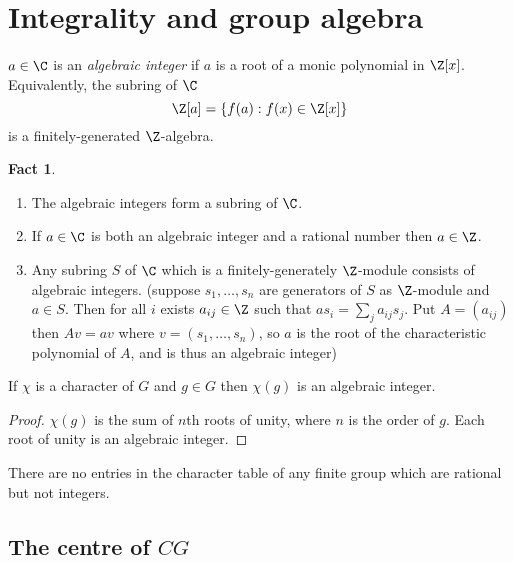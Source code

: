 \documentclass[a4paper]{article}
\theoremstyle{definition}
\newtheorem*{fact}{Fact}
\begin{document}
\section{Integrality and group algebra}

\begin{definition}
  \(a \in \C\) is an \emph{algebraic integer} if \(a\) is a root of a monic polynomial in \(\Z[x]\). Equivalently, the subring of \(\C\)
  \[
    \Z[a] = \{f(a): f(x) \in \Z[x]\}
  \]
  is a finitely-generated \(\Z\)-algebra.
\end{definition}

\begin{fact}\leavevmode
  \begin{enumerate}
  \item The algebraic integers form a subring of \(\C\).
  \item If \(a \in \C\) is both an algebraic integer and a rational number then \(a \in \Z\).
  \item Any subring \(S\) of \(\C\) which is a finitely-generately \(\Z\)-module consists of algebraic integers. (suppose \(s_1, \dots, s_n\) are generators of \(S\) as \(\Z\)-module and \(a \in S\). Then for all \(i\) exists \(a_{ij} \in \Z\) such that \(as_i = \sum_j a_{ij} s_j\). Put \(A = (a_{ij})\) then \(Av = av\) where \(v = (s_1, \dots, s_n)\), so \(a\) is the root of the characteristic polynomial of \(A\), and is thus an algebraic integer)
  \end{enumerate}
\end{fact}

\begin{proposition}
  If \(\chi\) is a character of \(G\) and \(g \in G\) then \(\chi(g)\) is an algebraic integer.
\end{proposition}

\begin{proof}
  \(\chi(g)\) is the sum of \(n\)th roots of unity, where \(n\) is the order of \(g\). Each root of unity is an algebraic integer.
\end{proof}

\begin{corollary}
  There are no entries in the character table of any finite group which are rational but not integers.
\end{corollary}

\subsection{The centre of \(C G\)} %
\end{document}

